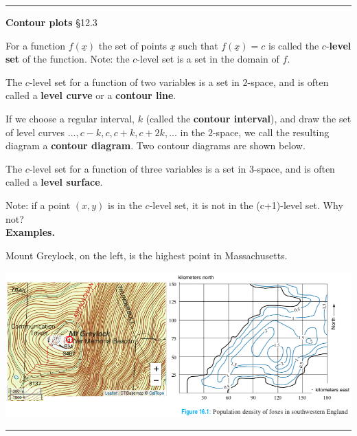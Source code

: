 \documentclass[12pt,letterpaper,noanswers]{exam}
\begin{document}
\vspace{0.2cm}
\hrule
\vspace{0.2cm}

\noindent\textbf{Contour plots} \S 12.3
\begin{tcolorbox}
For a function $f(\underline{x})$ the set of points $\underline{x}$ such that $f(\underline{x}) = c$ is called the $c$-\textbf{level set} of the function.  Note: the $c$-level set is a set in the domain of $f$.

The $c$-level set for a function of two variables is a set in $2$-space, and is often called a \textbf{level curve} or a \textbf{contour line}.  

If we choose a regular interval, $k$ (called the \textbf{contour interval}), and draw the set of level curves $..., c-k, c, c+k, c+2k, ...$ in the $2$-space, we call the resulting diagram a \textbf{contour diagram}.  Two contour diagrams are shown below.

The $c$-level set for a function of three variables is a set in $3$-space, and is often called a \textbf{level surface}.  




\end{tcolorbox}




Note: if a point $(x,y)$ is in the $c$-level set, it is not in the (c+1)-level set.  Why not? \\

\noindent\textbf{Examples.}

Mount Greylock, on the left, is the highest point in Massachusetts.

\begin{center}
\includegraphics[width=0.9\linewidth]{img/C03contours.png}
\end{center}


\vspace{0.2cm}
\hrule
\vspace{0.2cm}
\end{document}
